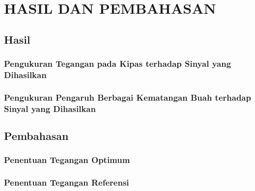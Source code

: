 \chapter{HASIL DAN PEMBAHASAN}
	\section{Hasil}
	\subsection{Pengukuran Tegangan pada Kipas terhadap Sinyal yang Dihasilkan}
		
	\subsection{Pengukuran Pengaruh Berbagai Kematangan Buah terhadap Sinyal yang Dihasilkan}
		
	\section{Pembahasan}
	\subsection{Penentuan Tegangan Optimum}
		
	\subsection{Penentuan Tegangan Referensi}